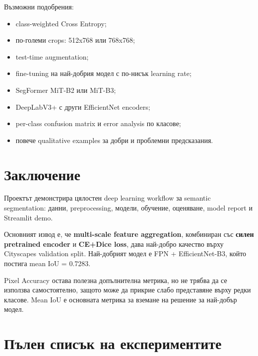 \documentclass[12pt,a4paper]{article}
\begin{document}
Възможни подобрения:

\begin{itemize}
  \item class-weighted Cross Entropy;
  \item по-големи crops: 512x768 или 768x768;
  \item test-time augmentation;
  \item fine-tuning на най-добрия модел с по-нисък learning rate;
  \item SegFormer MiT-B2 или MiT-B3;
  \item DeepLabV3+ с други EfficientNet encoders;
  \item per-class confusion matrix и error analysis по класове;
  \item повече qualitative examples за добри и проблемни предсказания.
\end{itemize}

\section{Заключение}

Проектът демонстрира цялостен deep learning workflow за semantic segmentation: данни, preprocessing, модели, обучение, оценяване, model report и Streamlit demo.

Основният извод е, че \textbf{multi-scale feature aggregation}, комбиниран със \textbf{силен pretrained encoder} и \textbf{CE+Dice loss}, дава най-добро качество върху Cityscapes validation split. Най-добрият модел е FPN + EfficientNet-B3, който постига mean IoU = 0.7283.

Pixel Accuracy остава полезна допълнителна метрика, но не трябва да се използва самостоятелно, защото може да прикрие слабо представяне върху редки класове. Mean IoU е основната метрика за вземане на решение за най-добър модел.

\newpage
\appendix
\section{Пълен списък на експериментите}
\end{document}
